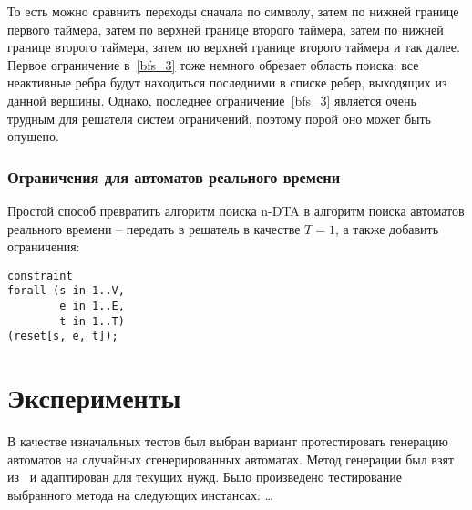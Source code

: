 \documentclass[times,specification,annotation]{itmo-student-thesis}
\begin{document}
То есть можно сравнить переходы сначала по символу, затем по нижней границе первого таймера, затем по верхней границе второго таймера, затем по нижней границе второго таймера, затем
по верхней границе второго таймера и так далее. Первое ограничение в~\ref{bfs_3} тоже немного обрезает область поиска: все неактивные ребра будут находиться последними в списке ребер,
выходящих из данной вершины. Однако, последнее ограничение~\ref{bfs_3} является очень трудным для решателя систем ограничений, поэтому порой оно может быть опущено.

\subsection{Ограничения для автоматов реального времени}

Простой способ превратить алгоритм поиска n-DTA в алгоритм поиска автоматов реального времени -- передать в решатель в качестве $T = 1$, а также добавить ограничения:

\begin{lstlisting}[float=!h,language=Mzn,caption={Ограничения RTA},label={rta_constraints}]
constraint
forall (s in 1..V,
        e in 1..E,
        t in 1..T)
(reset[s, e, t]);
\end{lstlisting}

\chapter{Эксперименты}

В качестве изначальных тестов был выбран вариант протестировать генерацию автоматов на случайных сгенерированных автоматах. Метод генерации был взят из~\cite{rti-plus} и адаптирован для текущих
нужд. Было произведено тестирование выбранного метода на следующих инстансах: \ldots

\chapterconclusion

\startconclusionpage

\printmainbibliography

\appendix
\end{document}
